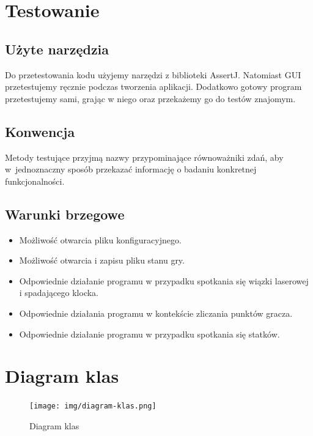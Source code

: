 \documentclass[a4paper]{article}
\begin{document}
\section{Testowanie}
\subsection{Użyte narzędzia}
Do przetestowania kodu użyjemy narzędzi z biblioteki AssertJ. Natomiast GUI przetestujemy ręcznie podczas tworzenia aplikacji. Dodatkowo gotowy program przetestujemy sami, grając w niego oraz przekażemy go do testów znajomym.

\subsection{Konwencja}
Metody testujące przyjmą nazwy przypominające równoważniki zdań, aby w~jednoznaczny sposób przekazać informację o badaniu konkretnej funkcjonalności.


\subsection{Warunki brzegowe}
\begin{itemize}
    \item Możliwość otwarcia pliku konfiguracyjnego.
    \item Możliwość otwarcia i zapisu pliku stanu gry.
    \item Odpowiednie działanie programu w przypadku spotkania się wiązki laserowej i spadającego klocka.
    \item Odpowiednie działania programu w kontekście zliczania punktów gracza.
    \item Odpowiednie działanie programu w przypadku spotkania się statków.
\end{itemize}

\section{Diagram klas}
\begin{figure}[H]
    \centering
    \texttt{[image: img/diagram-klas.png]}
    \caption{Diagram klas}
    \label{fig:diagram}
\end{figure}
\label{end}
\end{document}
